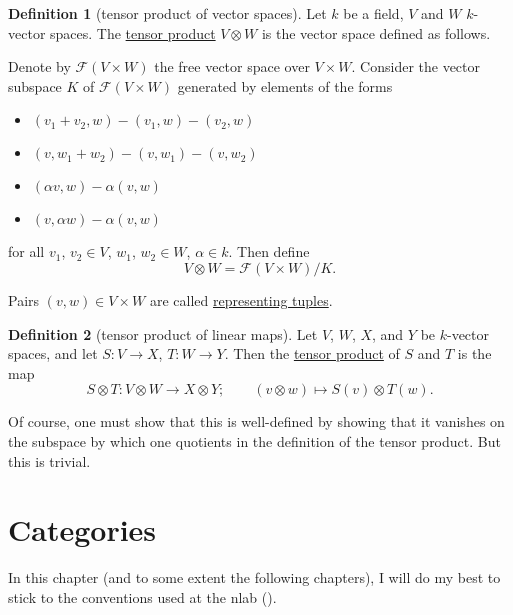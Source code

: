 \documentclass[a4paper]{report}
\newcommand{\defn}[1]{\ul{#1}}
\theoremstyle{definition}
\newtheorem{definition}{Definition}[section]
\theoremstyle{plain}
\theoremstyle{remark}
\begin{document}
\begin{definition}[tensor product of vector spaces]
  \label{def:tensorproductofvectorspaces}
  Let $k$ be a field, $V$ and $W$ $k$-vector spaces. The \defn{tensor product} $V \otimes W$ is the vector space defined as follows.

  Denote by $\mathcal{F}(V \times W)$ the free vector space over $V \times W$. Consider the vector subspace $K$ of $\mathcal{F}(V \times W)$ generated by elements of the forms 
  \begin{itemize}
    \item $(v_{1} + v_{2}, w) - (v_{1}, w) - (v_{2}, w)$
    \item $(v, w_{1} + w_{2}) - (v, w_{1}) - (v, w_{2})$
    \item $(\alpha v, w) - \alpha (v, w)$
    \item $(v, \alpha w) - \alpha (v, w)$
  \end{itemize}
  for all $v_{1}$, $v_{2} \in V$, $w_{1}$, $w_{2} \in W$, $\alpha \in k$. Then define
  \begin{equation*}
    V \otimes W = \mathcal{F}(V \times W) / K.
  \end{equation*}

  Pairs $(v, w) \in V \times W$ are called \defn{representing tuples}.
\end{definition}

\begin{definition}[tensor product of linear maps]
  \label{def:tensorproductoflinearmaps}
  Let $V$, $W$, $X$, and $Y$ be $k$-vector spaces, and let $S\colon V \to X$, $T\colon W \to Y$. Then the \defn{tensor product} of $S$ and $T$ is the map
  \begin{equation*}
    S \otimes T\colon V \otimes W \to X \otimes Y;\qquad (v \otimes w) \mapsto S(v) \otimes T(w).
  \end{equation*}

  Of course, one must show that this is well-defined by showing that it vanishes on the subspace by which one quotients in the definition of the tensor product. But this is trivial.
\end{definition}

\chapter{Categories} 
In this chapter (and to some extent the following chapters), I will do my best to stick to the conventions used at the nlab (\cite{nlab}).
\end{document}
